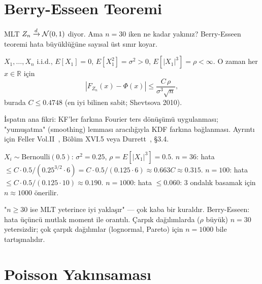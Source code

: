 \section{Berry-Esseen Teoremi}
\label{sec:berry_esseen}

\begin{motivasyon}
MLT $Z_n \xrightarrow{d} \mathcal{N}(0,1)$ diyor. Ama $n = 30$ iken ne kadar yakınız?
Berry-Esseen teoremi hata büyüklüğüne sayısal üst sınır koyar.
\end{motivasyon}

\begin{teorem}
\label{thm:berry_esseen}
$X_1, \ldots, X_n$ i.i.d., $E[X_1] = 0$, $E[X_1^2] = \sigma^2 > 0$,
$E[|X_1|^3] = \rho < \infty$. O zaman her $x \in \mathbb{R}$ için
\[
  \left|F_{Z_n}(x) - \Phi(x)\right| \leq \frac{C\,\rho}{\sigma^3\sqrt{n}},
\]
burada $C \leq 0.4748$ (en iyi bilinen sabit; Shevtsova 2010).
\end{teorem}

İspatın ana fikri: KF'ler farkına Fourier ters dönüşümü uygulanması;
"yumuşatma" (smoothing) lemması aracılığıyla KDF farkına bağlanması.
Ayrıntı için Feller Vol.II~\cite{Feller1971}, Bölüm XVI.5 veya Durrett~\cite{Durrett2019}, §3.4.

\begin{ornek}
$X_i \sim \mathrm{Bernoulli}(0.5)$: $\sigma^2 = 0.25$, $\rho = E[|X_1|^3] = 0.5$.
$n = 36$: hata $\leq C \cdot 0.5/(0.25^{3/2}\cdot 6) = C \cdot 0.5/(0.125\cdot 6) \approx 0.663C \approx 0.315$.
$n = 100$: hata $\leq C\cdot 0.5/(0.125\cdot 10) \approx 0.190$.
$n = 1000$: hata $\leq 0.060$: 3 ondalık basamak için $n \approx 1000$ önerilir.
\end{ornek}

\begin{hataanalizi}
"$n \geq 30$ ise MLT yeterince iyi yaklaşır" --- çok kaba bir kuraldır.
Berry-Esseen: hata üçüncü mutlak moment ile orantılı.
Çarpık dağılımlarda ($\rho$ büyük) $n = 30$ yetersizdir;
çok çarpık dağılımlar (lognormal, Pareto) için $n = 1000$ bile tartışmalıdır.
\end{hataanalizi}

\section{Poisson Yakınsaması}
\label{sec:poisson_yaklinsama}

